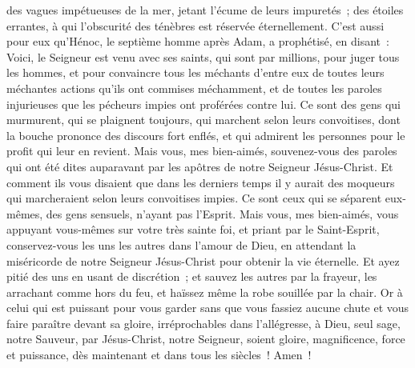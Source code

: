 \begin{multicols}{2}
des vagues impétueuses de la mer, jetant l'écume de leurs impuretés~; des étoiles errantes, à qui l'obscurité des ténèbres est réservée éternellement.
C'est aussi pour eux qu'Hénoc, le septième homme après Adam, a prophétisé, en disant~:
Voici, le Seigneur est venu avec ses saints, qui sont par millions, pour juger tous les hommes, et pour convaincre tous les méchants d'entre eux de toutes leurs méchantes actions qu'ils ont commises méchamment, et de toutes les paroles injurieuses que les pécheurs impies ont proférées contre lui.
Ce sont des gens qui murmurent, qui se plaignent toujours, qui marchent selon leurs convoitises, dont la bouche prononce des discours fort enflés, et qui admirent les personnes pour le profit qui leur en revient.
Mais vous, mes bien-aimés, souvenez-vous des paroles qui ont été dites auparavant par les apôtres de notre Seigneur Jésus-Christ.
Et comment ils vous disaient que dans les derniers temps il y aurait des moqueurs qui marcheraient selon leurs convoitises impies.
Ce sont ceux qui se séparent eux-mêmes, des gens sensuels, n'ayant pas l'Esprit.
Mais vous, mes bien-aimés, vous appuyant vous-mêmes sur votre très sainte foi, et priant par le Saint-Esprit,
conservez-vous les uns les autres dans l'amour de Dieu, en attendant la miséricorde de notre Seigneur Jésus-Christ pour obtenir la vie éternelle.
Et ayez pitié des uns en usant de discrétion~;
et sauvez les autres par la frayeur, les arrachant comme hors du feu, et haïssez même la robe souillée par la chair.
Or à celui qui est puissant pour vous garder sans que vous fassiez aucune chute et vous faire paraître devant sa gloire, irréprochables dans l'allégresse,
à Dieu, seul sage, notre Sauveur, par Jésus-Christ, notre Seigneur, soient gloire, magnificence, force et puissance, dès maintenant et dans tous les siècles~! Amen~!
\PPE{}
\end{multicols}
